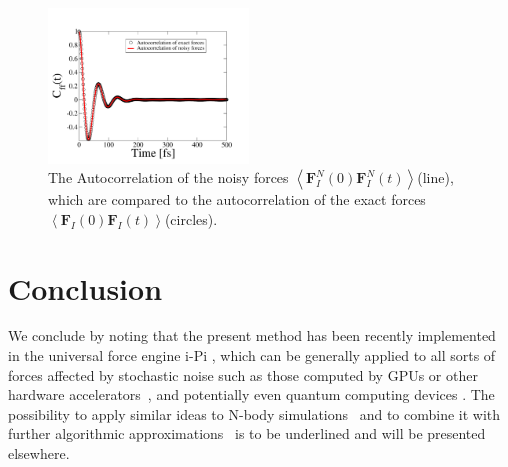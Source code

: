 \documentclass[format=acmsmall,review,timestamp,urlbreakonhyphens]{acmart}
\begin{document}
\begin{figure}%
\begin{center}
\includegraphics[width=0.475\textwidth]
{figures/AutocorrelationPlot_n.pdf}
\end{center}
\caption{\label{Fig4}
The Autocorrelation of the noisy forces \(
\left \langle \textbf{F}_{I}^{N}\left ( 0 \right ) \textbf{F}_{I}^{N}\left ( t \right )\right \rangle \)(line), which are compared to the autocorrelation of the exact forces \( \left \langle \textbf{F}_{I}\left ( 0 \right ) \textbf{F}_{I}\left ( t \right )\right \rangle \)(circles).
} \end{figure}


\section{Conclusion}
\label{sec:conclusion}
We conclude by noting that the present method has been recently implemented in the universal force engine i-Pi \cite{iPi}, which can be generally applied to all sorts of forces affected by stochastic noise such as those computed by GPUs or other hardware accelerators~\cite{HOOMD, NAMD, OpenMM, HalMD, Lammps, Amber, Gromacs}, and potentially even quantum computing devices \cite{Steane, Knill, Blatt, Chow}. The possibility to apply similar ideas to N-body simulations~\cite{White, Makino} and to combine it with further algorithmic approximations~\cite{LassAC} is to be underlined and will be presented elsewhere.
\end{document}
